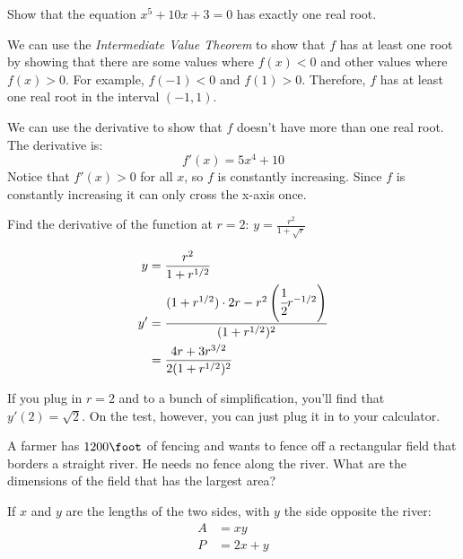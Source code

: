 \documentclass[fleqn,addpoints]{exam}
\begin{document}
\begin{questions}
\question
Show that the equation $x^5 + 10x + 3 = 0$ has exactly one real root.
\begin{solution}

We can use the {\em Intermediate Value Theorem} to show that $f$ has at least one root by showing that there are some
values where $f(x) < 0$ and other values where $f(x) > 0$.  For example, $f(-1) < 0$ and $f(1) > 0$.  Therefore, $f$ has
at least one real root in the interval $(-1, 1)$.

We can use the derivative to show that $f$ doesn't have more than one real root.  The derivative is:
\[
  f'(x) = 5x^4 + 10
\]
Notice that $f'(x) > 0$ for all $x$, so $f$ is constantly increasing.  Since $f$ is constantly increasing it can only
cross the x-axis once.

\end{solution}

\ifprintanswers
\pagebreak
\fi

\question Find the derivative of the function at $r = 2$: $y = \frac{r^2}{1 + \sqrt{r}}$
\begin{solution}
\begin{align*}
  y &= \frac{r^2}{1 + r^{1/2}} \\
  y' &= \frac{(1 + r^{1/2}) \cdot 2r - r^2 \left(\cfrac{1}{2} r^{-1/2} \right) } {(1 + r^{1/2})^2} \\
     &= \frac{4r + 3r^{3/2}}{2 (1 + r^{1/2})^2} \\
\end{align*}

If you plug in $r = 2$ and to a bunch of simplification, you'll find that $y'(2) = \sqrt{2}$.  On the test, however, you
can just plug it in to your calculator.

\end{solution}



\question A farmer has $1200 \foot$ of fencing and wants to fence off a rectangular field that borders a straight
river. He needs no fence along the river. What are the dimensions of the field that has the largest area?

\begin{solution}
If $x$ and $y$ are the lengths of the two sides, with $y$ the side opposite the river:
\begin{align*}
  A &= xy \\
  P &= 2x + y \\
\end{align*}


\end{solution}
\end{questions}
\end{document}
